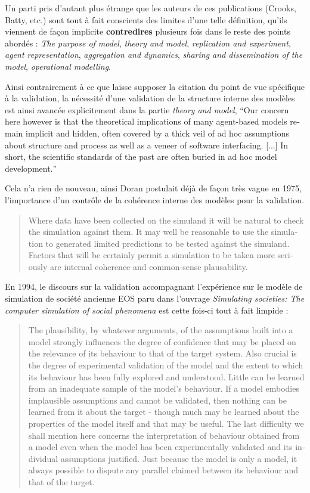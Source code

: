 Un parti pris d'autant plus étrange que les auteurs de ces publications (Crooks, Batty, etc.) sont tout à fait conscients des limites d'une telle définition, qu'ils viennent de façon implicite \textbf{contredires} plusieurs fois dans le reste des points abordés : \textit{The purpose of model}, \textit{theory and model}, \textit{replication and experiment}, \textit{agent representation}, \textit{aggregation and dynamics}, \textit{sharing and dissemination of the model}, \textit{operational modelling}.

Ainsi contrairement à ce que laisse supposer la citation du point de vue spécifique à la validation, la nécessité d'une validation de la structure interne des modèles est ainsi avancée explicitement dans la partie \textit{theory and model}, \foreignquote{english}{Our concern here however is that the theoretical implications of many agent-based models remain implicit and hidden, often covered by a thick veil of ad hoc assumptions about structure and process as well as a veneer of software interfacing. [...] In short, the scientific standards of the past are often buried in ad hoc model development.}

Cela n'a rien de nouveau, ainsi Doran postulait déjà de façon très vague en 1975, l'importance d'un contrôle de la cohérence interne des modèles pour la validation. 

\foreignblockquote{english}{Where data have been collected on the simuland it will be natural to check the simulation against them. It may well be reasonable to use the simulation to generated limited predictions to be tested against the simuland. Factors that will be certainly permit a simulation to be taken more seriously are internal coherence and common-sense plausability.} 

En 1994, le discours sur la validation accompagnant l'expérience sur le modèle de simulation de société ancienne EOS paru dans l'ouvrage \textit{Simulating societies: The computer simulation of social phenomena} est cette fois-ci tout à fait limpide :

\foreignblockquote{english}[{\cite[10-12]{Doran1994}}]{The plausibility, by whatever arguments, of the assumptions built into a model strongly influences the degree of confidence that may be placed on the relevance of its behaviour to that of the target system. Also crucial is the degree of experimental validation of the model and the extent to which its behaviour has been fully explored and understood. Little can be learned from an inadequate sample of the model's behaviour. If a model embodies implausible assumptions and cannot be validated, then nothing can be learned from it about the target - though much may be learned about the properties of the model itself and that may be useful. The last difficulty we shall mention here concerns the interpretation of behaviour obtained from a model even when the model has been experimentally validated and its individual assumptions justified. Just because the model is only a model, it always possible to dispute any parallel claimed between its behaviour and that of the target.}

